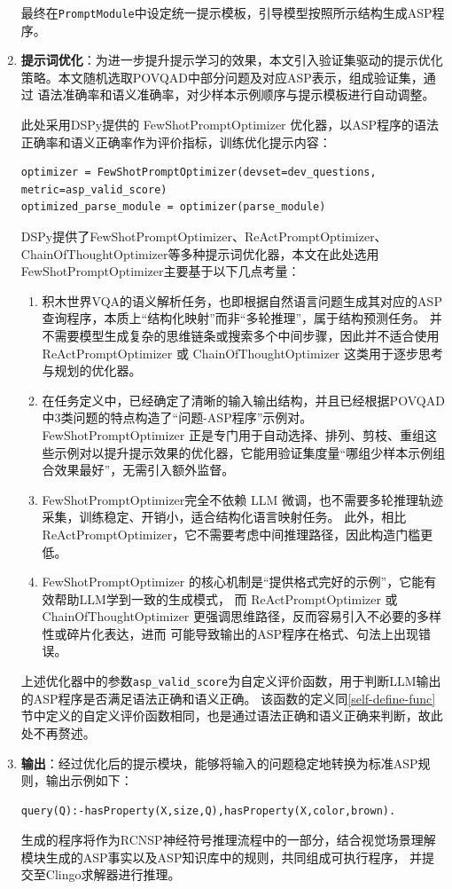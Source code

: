 \begin{enumerate}[nosep]
最终在\texttt{PromptModule}中设定统一提示模板，引导模型按照所示结构生成ASP程序。
\item \textbf{提示词优化}：为进一步提升提示学习的效果，本文引入验证集驱动的提示优化策略。本文随机选取POVQAD中部分问题及对应ASP表示，组成验证集，通过
语法准确率和语义准确率，对少样本示例顺序与提示模板进行自动调整。

此处采用DSPy提供的 FewShotPromptOptimizer 优化器，以ASP程序的语法正确率和语义正确率作为评价指标，训练优化提示内容：
\begin{lstlisting}
optimizer = FewShotPromptOptimizer(devset=dev_questions, metric=asp_valid_score)
optimized_parse_module = optimizer(parse_module)
\end{lstlisting}

DSPy提供了FewShotPromptOptimizer、ReActPromptOptimizer、ChainOfThoughtOptimizer等多种提示词优化器，本文在此处选用
FewShotPromptOptimizer主要基于以下几点考量：
\begin{enumerate}[nosep]
\item 积木世界VQA的语义解析任务，也即根据自然语言问题生成其对应的ASP查询程序，本质上“结构化映射”而非“多轮推理”，属于结构预测任务。
并不需要模型生成复杂的思维链条或搜索多个中间步骤，因此并不适合使用 ReActPromptOptimizer 或 ChainOfThoughtOptimizer 这类用于逐步思考与规划的优化器。
\item 在任务定义中，已经确定了清晰的输入输出结构，并且已经根据POVQAD中3类问题的特点构造了“问题-ASP程序”示例对。
FewShotPromptOptimizer 正是专门用于自动选择、排列、剪枝、重组这些示例对以提升提示效果的优化器，它能用验证集度量“哪组少样本示例组合效果最好”，无需引入额外监督。
\item FewShotPromptOptimizer完全不依赖 LLM 微调，也不需要多轮推理轨迹采集，训练稳定、开销小，适合结构化语言映射任务。
此外，相比 ReActPromptOptimizer，它不需要考虑中间推理路径，因此构造门槛更低。
\item FewShotPromptOptimizer 的核心机制是“提供格式完好的示例”，它能有效帮助LLM学到一致的生成模式，
而 ReActPromptOptimizer 或 ChainOfThoughtOptimizer 更强调思维路径，反而容易引入不必要的多样性或碎片化表达，进而
可能导致输出的ASP程序在格式、句法上出现错误。
\end{enumerate}

上述优化器中的参数\texttt{asp\_valid\_score}为自定义评价函数，用于判断LLM输出的ASP程序是否满足语法正确和语义正确。
该函数的定义同\ref{self-define-func}节中定义的自定义评价函数相同，也是通过语法正确和语义正确来判断，故此处不再赘述。
\item \textbf{输出}：经过优化后的提示模块，能够将输入的问题稳定地转换为标准ASP规则，输出示例如下：
\begin{lstlisting}
query(Q):-hasProperty(X,size,Q),hasProperty(X,color,brown).
\end{lstlisting}

生成的程序将作为RCNSP神经符号推理流程中的一部分，结合视觉场景理解模块生成的ASP事实以及ASP知识库中的规则，共同组成可执行程序，
并提交至Clingo求解器进行推理。
\end{enumerate}
